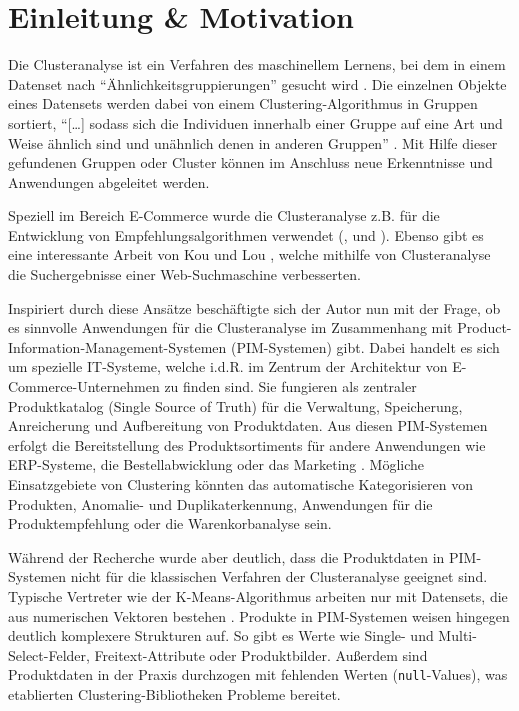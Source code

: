 \hypertarget{einleitung-motivation}{%
\section{Einleitung \& Motivation}\label{einleitung-motivation}}

Die Clusteranalyse ist ein Verfahren des maschinellem Lernens, bei dem
in einem Datenset nach ``Ähnlichkeitsgruppierungen'' gesucht wird
\autocite[ Kap. 5.2.3 Unüberwachtes Lernen]{papp2019}. Die einzelnen
Objekte eines Datensets werden dabei von einem Clustering-Algorithmus in
Gruppen sortiert, ``{[}\ldots{]} sodass sich die Individuen innerhalb
einer Gruppe auf eine Art und Weise ähnlich sind und unähnlich denen in
anderen Gruppen'' \autocite[ Kap. 1.1 What Is a Cluster?]{king2015}. Mit
Hilfe dieser gefundenen Gruppen oder Cluster können im Anschluss neue
Erkenntnisse und Anwendungen abgeleitet werden. \autocite[Kap. 5.2.3
Unüberwachtes Lernen]{papp2019}

Speziell im Bereich E-Commerce wurde die Clusteranalyse z.B. für die
Entwicklung von Empfehlungsalgorithmen verwendet (\autocite{oh2019},
\autocite{cui2021} und \autocite{kumar2001}). Ebenso gibt es eine
interessante Arbeit von Kou und Lou \autocite{kou2012}, welche mithilfe
von Clusteranalyse die Suchergebnisse einer Web-Suchmaschine
verbesserten.

Inspiriert durch diese Ansätze beschäftigte sich der Autor nun mit der
Frage, ob es sinnvolle Anwendungen für die Clusteranalyse im
Zusammenhang mit Product-Information-Management-Systemen (PIM-Systemen)
gibt. Dabei handelt es sich um spezielle IT-Systeme, welche i.d.R. im
Zentrum der Architektur von E-Commerce-Unternehmen zu finden sind. Sie
fungieren als zentraler Produktkatalog (Single Source of Truth) für die
Verwaltung, Speicherung, Anreicherung und Aufbereitung von Produktdaten.
Aus diesen PIM-Systemen erfolgt die Bereitstellung des Produktsortiments
für andere Anwendungen wie ERP-Systeme, die Bestellabwicklung oder das
Marketing \autocite{pimcore2021}. Mögliche Einsatzgebiete von Clustering
könnten das automatische Kategorisieren von Produkten, Anomalie- und
Duplikaterkennung, Anwendungen für die Produktempfehlung oder die
Warenkorbanalyse sein.

Während der Recherche wurde aber deutlich, dass die Produktdaten in
PIM-Systemen nicht für die klassischen Verfahren der Clusteranalyse
geeignet sind. Typische Vertreter wie der K-Means-Algorithmus arbeiten
nur mit Datensets, die aus numerischen Vektoren bestehen
\autocite{huang1998}. Produkte in PIM-Systemen weisen hingegen deutlich
komplexere Strukturen auf. So gibt es Werte wie Single- und
Multi-Select-Felder, Freitext-Attribute oder Produktbilder. Außerdem
sind Produktdaten in der Praxis durchzogen mit fehlenden Werten
(\texttt{null}-Values), was etablierten Clustering-Bibliotheken Probleme
bereitet. \autocite{sklearn2022}

